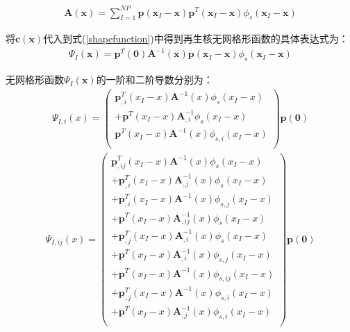 \begin{equation}
\begin{split}
    \pmb{A}(\pmb{x})=\sum_{I=1}^{N\!P}\pmb{p}(\pmb{x}_I-\pmb{x})\pmb{p}^T(\pmb{x}_I-\pmb{x})\phi_s(\pmb{x}_I-\pmb{x})
\end{split}
\end{equation}\par
将$\pmb{c}(\pmb{x})$代入到式(\ref{shapefunction})中得到再生核无网格形函数的具体表达式为：
\begin{equation}
\begin{split}
    \Psi_I(\pmb{x})=\pmb{p}^T(\pmb{0})\pmb{A}^{-1}(\pmb{x})\pmb{p}(\pmb{x}_I-\pmb{x})\phi_s(\pmb{x}_I-\pmb{x})
\end{split}
\end{equation}\par
无网格形函数$\Psi_I(\pmb{x})$的一阶和二阶导数分别为：
\begin{equation}
\begin{split}
    \Psi_{I,i}(x)=\left(\begin{matrix}
    \pmb p_{,i}^{T}(x_I-x)\pmb A^{-1}(x)\phi_s(x_I-x)\\
    +\pmb p^{T}(x_I-x)\pmb A_{,i}^{-1}\phi_s(x_I-x)\\
    \pmb p^{T}(x_I-x)\pmb A^{-1}(x)\phi _{s,i}(x_I-x)\\
    \end{matrix}\right)
    \pmb p(\pmb 0)
\end{split}
\end{equation}
\begin{equation}
\begin{split}
    \Psi_{I,ij}(x)=\left(\begin{matrix}
    \pmb p_{,ij}^{T}(x_I-x)\pmb A^{-1}(x)\phi_s(x_I-x)\\
    +\pmb p_{,i}^{T}(x_I-x)\pmb A_{,j}^{-1}(x)\phi_s(x_I-x)\\
    +\pmb p_{,i}^{T}(x_I-x)\pmb A^{-1}(x)\phi_{s,j}(x_I-x)\\
    +\pmb p^{T}(x_I-x)\pmb A_{,ij}^{-1}(x)\phi_s(x_I-x)\\
    +\pmb p_{,j}^{T}(x_I-x)\pmb A_{,i}^{-1}(x)\phi_s(x_I-x)\\
    +\pmb p^{T}(x_I-x)\pmb A_{,i}^{-1}(x)\phi_{s,j}(x_I-x)\\
    +\pmb p^{T}(x_I-x)\pmb A^{-1}(x)\phi_{s,ij}(x_I-x)\\
    +\pmb p_{,j}^{T}(x_I-x)\pmb A^{-1}(x)\phi_{s,i}(x_I-x)\\
    +\pmb p^{T}(x_I-x)\pmb A_{,j}^{-1}(x)\phi_{s,i}(x_I-x)\\
    \end{matrix}\right)
    \pmb p(\pmb 0)
\end{split}
\end{equation}
